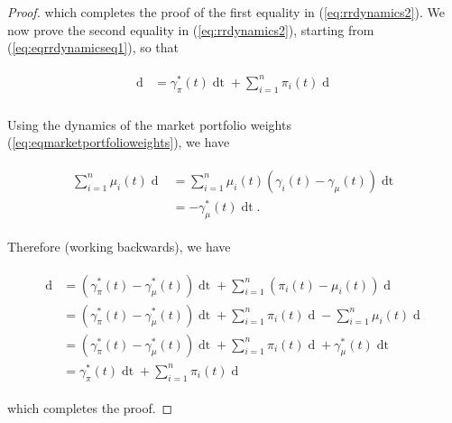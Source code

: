 \documentclass[british]{amsart} \usepackage{lmodern}
\numberwithin{equation}{section} \numberwithin{figure}{section}
\theoremstyle{plain} \newtheorem{thm}{\protect\theoremname}[section]
\theoremstyle{definition} \newtheorem{defn}[thm]{\protect\definitionname}
\theoremstyle{plain} \newtheorem{assumption}[thm]{\protect\assumptionname}
\theoremstyle{plain} \newtheorem{lem}[thm]{\protect\lemmaname}
\theoremstyle{plain} \newtheorem{prop}[thm]{\protect\propositionname}
\theoremstyle{remark} \newtheorem{rem}[thm]{\protect\remarkname}
\theoremstyle{plain} \newtheorem{cor}[thm]{\protect\corollaryname}
\renewcommand{\d}[1]{\mathop{\mathrm{d}{#1}}}
\begin{document}
\begin{proof}
  which completes the proof of the first equality in (\ref{eq:rrdynamics2}). We now 
  prove the second equality in (\ref{eq:rrdynamics2}), starting from
  (\ref{eq:eqrrdynamicseq1}), so that

  \begin{gather*} 
    \begin{split} 
     \d{ \log{ \left( \frac{V^{\pi}(t) }{ V^{\mu}(t) } \right) } } 
      &= \gamma_{\pi}^{*}(t)\d{t} + 
            \sum_{i=1}^{n} \pi_{i}(t)  \d{ \log{\mu_{i}(t)} } \\ 
    \end{split} 
  \end{gather*}

  Using the dynamics of the market portfolio weights (\ref{eq:eqmarketportfolioweights}), we have

  \begin{gather*} 
    \begin{split} 
      \sum_{i=1}^{n} \mu_{i}(t) \d{\log{\mu_{i}(t)}} 
    &= 
      \sum_{i=1}^{n} \mu_{i}(t) \left( \gamma_{i}(t) - \gamma_{\mu}(t) \right)\d{t} \\
    &= 
      -\gamma^{*}_{\mu}(t)\d{t}.
    \end{split}
  \end{gather*}

  Therefore (working backwards), we have

  \begin{gather*} 
    \begin{split} 
     \d{ \log{ \left( \frac{V^{\pi}(t) }{ V^{\mu}(t) } \right) } } 
      &= (\gamma_{\pi}^{*}(t) - \gamma_{\mu}^{*}(t)) \d{t} +
            \sum_{i=1}^{n} (\pi_{i}(t) - \mu_{i}(t)) \d{\log{\mu_{i}(t)} } \\
      &= (\gamma_{\pi}^{*}(t) - \gamma_{\mu}^{*}(t)) \d{t} +
            \sum_{i=1}^{n} \pi_{i}(t) \d{\log{\mu_{i}(t)} } - 
            \sum_{i=1}^{n} \mu_{i}(t) \d{\log{\mu_{i}(t)} } \\
      &= (\gamma_{\pi}^{*}(t) - \gamma_{\mu}^{*}(t)) \d{t} +
            \sum_{i=1}^{n} \pi_{i}(t) \d{\log{\mu_{i}(t)} } 
            + \gamma^{*}_{\mu}(t)\d{t} \\
      &= \gamma_{\pi}^{*}(t) \d{t} + \sum_{i=1}^{n} \pi_{i}(t) \d{\log{\mu_{i}(t)} } 
    \end{split} 
  \end{gather*}

  which completes the proof.

\end{proof}
\end{document}

